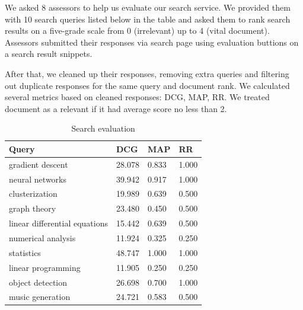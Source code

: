 We asked 8 assessors to help us evaluate our search service. 
We provided them with 10 search queries listed below in the table and asked them to rank search results on a five-grade scale from 0 (irrelevant) up to 4 (vital document).
Assessors submitted their responses via search page using evaluation buttions on a search result snippets.

After that, we cleaned up their responses, removing extra queries and filtering out duplicate responses for the same query and document rank.
We calculated several metrics based on cleaned responses: DCG, MAP, RR. We treated document as a relevant if it had average score no less than 2.

\begin{table}
    \centering 
    \begin{tabular}{| l | l | l | l |}
        \toprule
        Query & DCG & MAP & RR \\ 
        \midrule
        gradient descent & 28.078 & 0.833 & 1.000 \\  
        neural networks & 39.942 & 0.917 & 1.000 \\  
        clusterization & 19.989 & 0.639 & 0.500 \\  
        graph theory & 23.480 & 0.450 & 0.500 \\  
        linear differential equations & 15.442 & 0.639 & 0.500 \\  
        numerical analysis & 11.924 & 0.325 & 0.250 \\  
        statistics & 48.747 & 1.000 & 1.000 \\  
        linear programming & 11.905 & 0.250 & 0.250 \\  
        object detection & 26.698 & 0.700 & 1.000 \\  
        music generation & 24.721 & 0.583 & 0.500 \\  
        \bottomrule
    \end{tabular}
    \caption{Search evaluation}
\end{table}
